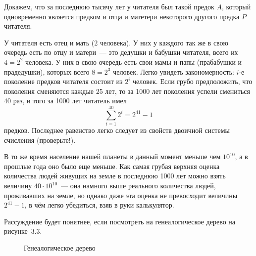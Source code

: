 \begin{example}
Докажем, что за последнюю тысячу лет у читателя был такой предок $A$, который одновременно является предком и отца и матетери некоторого другого предка $P$ читателя.

У читателя есть отец и мать (2 человека). У них у каждого так же в свою очередь есть по отцу и матери~--- это дедушки и бабушки читателя, всего их $4=2^2$ человека. У них в свою очередь есть свои мамы и папы (прабабушки и прадедушки), которых всего $8=2^3$ человек. Легко увидеть закономерность: $i$-е поколение предков читателя состоит из $2^i$ человек. Если грубо предположить, что поколения сменяются каждые 25 лет, то за 1000 лет поколения успели смениться 40 раз, и того за 1000 лет читатель имел
$$\sum_{i=1}^{40} 2^i = 2^{41} - 1$$
предков. Последнее равенство легко следует из свойств двоичной системы счисления (проверьте!).

В то же время население нашей планеты в данный момент меньше чем $10^{10}$, а в прошлые года оно было еще меньше. Как самая грубая верхняя оценка количества людей живущих на земле в последнюю 1000 лет можно взять величину $40\cdot 10^10$~--- она намного выше реального количества людей, проживавших на земле, но однако даже эта оценка не превосходит величины $2^{41} - 1$, в чём легко убедиться, взяв в руки калькулятор.

Рассуждение будет понятнее, если посмотреть на генеалогическое дерево на рисунке~3.3.

\begin{figure}[h]
\centering
{}
\caption{Генеалогическое дерево}
\end{figure}


\end{example}
